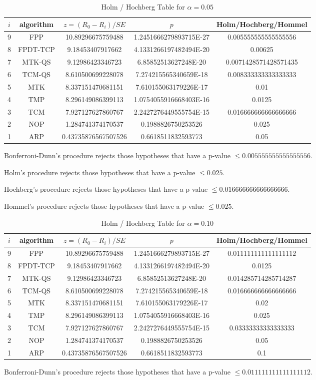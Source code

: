 \documentclass[a4paper,10pt]{article}
\begin{document}
\begin{landscape}
\begin{table}[!htp]
\centering\tiny
\caption{Holm / Hochberg Table for $\alpha=0.05$}
\begin{tabular}{ccccc}
$i$&algorithm&$z=(R_0 - R_i)/SE$&$p$&Holm/Hochberg/Hommel\\
\hline
9&FPP&10.89296675759488&1.2451666279893715E-27&0.005555555555555556\\
8&FPDT-TCP&9.18453407917662&4.1331266197482494E-20&0.00625\\
7&MTK-QS&9.12986423346723&6.85852513627248E-20&0.0071428571428571435\\
6&TCM-QS&8.610500699228078&7.274215565340659E-18&0.008333333333333333\\
5&MTK&8.337151470681151&7.610155063179226E-17&0.01\\
4&TMP&8.296149086399113&1.0754055916668403E-16&0.0125\\
3&TCM&7.927127627860767&2.2427276449555754E-15&0.016666666666666666\\
2&NOP&1.284741374170537&0.1988826750253526&0.025\\
1&ARP&0.43735876567507526&0.6618511832593773&0.05\\
\hline
\end{tabular}
\end{table}
Bonferroni-Dunn's procedure rejects those hypotheses that have a p-value $\le0.005555555555555556$.


Holm's procedure rejects those hypotheses that have a p-value $\le0.025$.


Hochberg's procedure rejects those hypotheses that have a p-value $\le0.016666666666666666$.


Hommel's procedure rejects those hypotheses that have a p-value $\le0.025$.


\begin{table}[!htp]
\centering\tiny
\caption{Holm / Hochberg Table for $\alpha=0.10$}
\begin{tabular}{ccccc}
$i$&algorithm&$z=(R_0 - R_i)/SE$&$p$&Holm/Hochberg/Hommel\\
\hline
9&FPP&10.89296675759488&1.2451666279893715E-27&0.011111111111111112\\
8&FPDT-TCP&9.18453407917662&4.1331266197482494E-20&0.0125\\
7&MTK-QS&9.12986423346723&6.85852513627248E-20&0.014285714285714287\\
6&TCM-QS&8.610500699228078&7.274215565340659E-18&0.016666666666666666\\
5&MTK&8.337151470681151&7.610155063179226E-17&0.02\\
4&TMP&8.296149086399113&1.0754055916668403E-16&0.025\\
3&TCM&7.927127627860767&2.2427276449555754E-15&0.03333333333333333\\
2&NOP&1.284741374170537&0.1988826750253526&0.05\\
1&ARP&0.43735876567507526&0.6618511832593773&0.1\\
\hline
\end{tabular}
\end{table}
Bonferroni-Dunn's procedure rejects those hypotheses that have a p-value $\le0.011111111111111112$.



\end{landscape}
\end{document}

